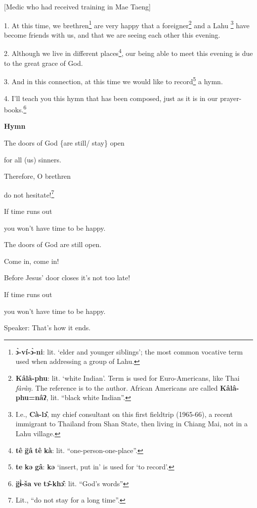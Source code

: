 \setcounter{footnote}{0}

[Medic who had received training in Mae Taeng]

1. At this time, we brethren\footnote{\textbf{ɔ̀-ví-ɔ̀-ni}: lit. `elder and younger siblings'; the most common vocative term used when addressing a group of Lahu.} are very happy that a foreigner\footnote{\textbf{Kâlâ-phu}: lit. `white Indian'. Term is used for Euro-Americans, like Thai \textit{fàràŋ.} The reference is to the author. African Americans are called \textbf{Kâlâ-phu=nâʔ}, lit. ``black white Indian''.} and a Lahu
\footnote{I.e., \textbf{Cà-lɔ̂}, my chief consultant on this first fieldtrip (1965-66), a recent immigrant to Thailand from Shan State, then living in Chiang Mai, not in a Lahu village.} have become friends with us, and that we are seeing each other this evening.

2. Although we live in different places\footnote{\textbf{tê} \textbf{g̈â} \textbf{tê} \textbf{kà}: lit. ``one-person-one-place''.}, our being able to meet this evening
is due to the great grace of God.

3. And in this connection, at this time we would like to record\footnote{\textbf{te} \textbf{kə} \textbf{gâ}: \textbf{kə} `insert, put in' is used for `to record'.} a hymn.

4. I'll teach you this hymn that has been composed, just as it is in our prayer-books.\footnote{\textbf{g̈ɨ̀-ša} \textbf{ve} \textbf{tɔ̂-khɔ̂}: lit. ``God's words''}

\textbf{Hymn}

The doors of God \{are still/ stay\} open

for all (us) sinners.

Therefore, O brethren

do not hesitate!\footnote{Lit., ``do not stay for a long time''.}

If time runs out

you won't have time to be happy.

The doors of God are still open.

Come in, come in!

Before Jesus' door closes it's not too late!

If time runs out

you won't have time to be happy.

Speaker: That's how it ends.

